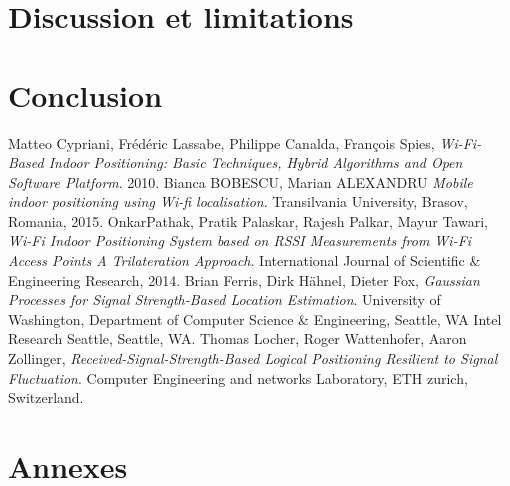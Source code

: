 \documentclass[11pt,journal,compsoc]{IEEEtran}
\begin{document}
\section{Discussion et limitations}
\section{Conclusion}

\begin{thebibliography}{9}
    Matteo Cypriani, Frédéric Lassabe, Philippe Canalda, François Spies,
    \emph{Wi-Fi-Based Indoor Positioning: Basic Techniques, Hybrid Algorithms and Open Software Platform}.
    2010.
    Bianca BOBESCU, Marian ALEXANDRU
    \emph{Mobile indoor positioning using Wi-fi localisation}.
    Transilvania University, Brasov, Romania,
    2015.
    OnkarPathak, Pratik Palaskar, Rajesh Palkar, Mayur Tawari,
    \emph{Wi-Fi Indoor Positioning System based on RSSI Measurements from Wi-Fi Access Points A Trilateration Approach}.
    International Journal of Scientific \& Engineering Research,
    2014.
    Brian Ferris, Dirk Hähnel, Dieter Fox,
    \emph{Gaussian Processes for Signal Strength-Based Location Estimation}.
    University of Washington, Department of Computer Science \& Engineering, Seattle, WA Intel Research Seattle, Seattle, WA.
    Thomas Locher, Roger Wattenhofer, Aaron Zollinger,
    \emph{Received-Signal-Strength-Based Logical Positioning Resilient to Signal Fluctuation}.
    Computer Engineering and networks Laboratory, ETH zurich, Switzerland.
\end{thebibliography}


\section*{Annexes}
\end{document}
